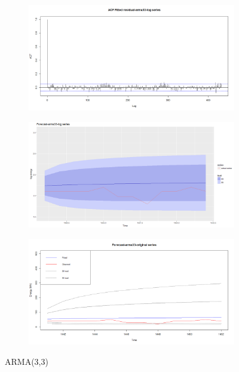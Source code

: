 \documentclass[12pt]{article}
\begin{document}
\begin{figure}[H]
\begin{subfigure}[b]{0.6\linewidth}
  \end{subfigure}
  \begin{subfigure}[b]{0.6\linewidth}
    \includegraphics[width=\linewidth]{figure16-4.png}
  \end{subfigure}
  \begin{subfigure}[b]{0.6\linewidth}
    \includegraphics[width=\linewidth]{figure16-5.png}
  \end{subfigure}
  \begin{subfigure}[b]{0.6\linewidth}
    \includegraphics[width=\linewidth]{figure16-6.png}
  \end{subfigure}
  \caption{ARMA(3,3)}
  \label{fig:figure17}
\end{figure}
\end{document}
